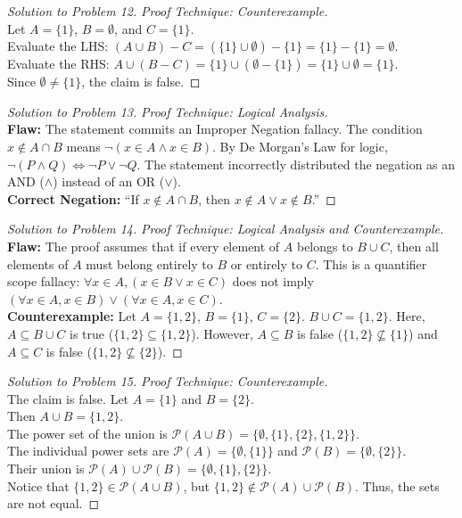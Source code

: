 \documentclass[12pt]{article}
\theoremstyle{definition}
\begin{document}
\begin{proof}[Solution to Problem 12]
\textit{Proof Technique: Counterexample.} \\
Let $A = \{1\}$, $B = \emptyset$, and $C = \{1\}$. \\
Evaluate the LHS: $(A \cup B) - C = (\{1\} \cup \emptyset) - \{1\} = \{1\} - \{1\} = \emptyset$. \\
Evaluate the RHS: $A \cup (B - C) = \{1\} \cup (\emptyset - \{1\}) = \{1\} \cup \emptyset = \{1\}$. \\
Since $\emptyset \neq \{1\}$, the claim is false.
\end{proof}

\begin{proof}[Solution to Problem 13]
\textit{Proof Technique: Logical Analysis.} \\
\textbf{Flaw:} The statement commits an Improper Negation fallacy. The condition $x \notin A \cap B$ means $\neg(x \in A \land x \in B)$. By De Morgan's Law for logic, $\neg(P \land Q) \iff \neg P \lor \neg Q$. The statement incorrectly distributed the negation as an AND ($\land$) instead of an OR ($\lor$). \\
\textbf{Correct Negation:} ``If $x \notin A \cap B$, then $x \notin A \lor x \notin B$.''
\end{proof}

\begin{proof}[Solution to Problem 14]
\textit{Proof Technique: Logical Analysis and Counterexample.} \\
\textbf{Flaw:} The proof assumes that if every element of $A$ belongs to $B \cup C$, then all elements of $A$ must belong entirely to $B$ or entirely to $C$. This is a quantifier scope fallacy: $\forall x \in A, (x \in B \lor x \in C)$ does not imply $(\forall x \in A, x \in B) \lor (\forall x \in A, x \in C)$. \\
\textbf{Counterexample:} Let $A = \{1, 2\}$, $B = \{1\}$, $C = \{2\}$. $B \cup C = \{1, 2\}$. Here, $A \subseteq B \cup C$ is true ($\{1, 2\} \subseteq \{1, 2\}$). However, $A \subseteq B$ is false ($\{1, 2\} \not\subseteq \{1\}$) and $A \subseteq C$ is false ($\{1, 2\} \not\subseteq \{2\}$).
\end{proof}

\begin{proof}[Solution to Problem 15]
\textit{Proof Technique: Counterexample.} \\
The claim is false. Let $A = \{1\}$ and $B = \{2\}$. \\
Then $A \cup B = \{1, 2\}$. \\
The power set of the union is $\mathcal{P}(A \cup B) = \{\emptyset, \{1\}, \{2\}, \{1, 2\}\}$. \\
The individual power sets are $\mathcal{P}(A) = \{\emptyset, \{1\}\}$ and $\mathcal{P}(B) = \{\emptyset, \{2\}\}$. \\
Their union is $\mathcal{P}(A) \cup \mathcal{P}(B) = \{\emptyset, \{1\}, \{2\}\}$. \\
Notice that $\{1, 2\} \in \mathcal{P}(A \cup B)$, but $\{1, 2\} \notin \mathcal{P}(A) \cup \mathcal{P}(B)$. Thus, the sets are not equal.
\end{proof}
\end{document}
